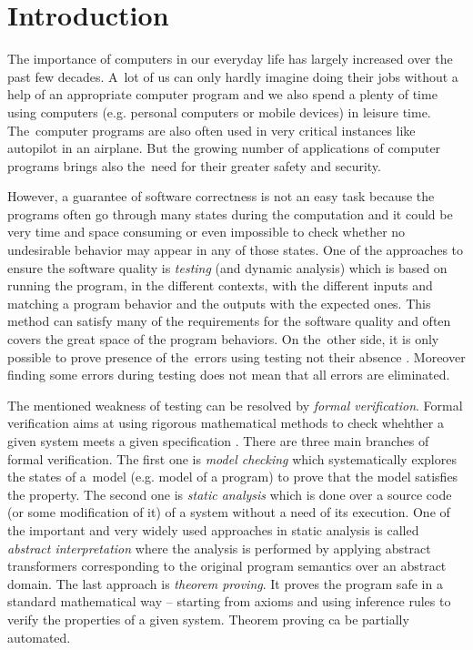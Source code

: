 \documentclass[fleqn,11pt]{ExcelAtFIT} %
\affiliation{*%
  \href{mailto:xhrusk16@stud.fit.vutbr.cz}{xhrusk16@stud.fit.vutbr.cz},
  \textit{Faculty of Information Technology, Brno University of Technology}}
\begin{document}
\startdocument



\section{Introduction}

The importance of computers in our everyday life has largely increased over the past few decades.
A~lot of us can only hardly imagine doing their jobs without a help of an appropriate computer program
and we also spend a plenty of time using computers (e.g. personal computers or mobile devices) in leisure time.
The~computer programs are also often used in very critical instances like autopilot in an airplane.
But the growing number of applications of computer programs brings also the~need for their greater safety and security.

However, a guarantee of software correctness is not an easy task
because the programs often go through many states during the computation
and it could be very time and space consuming or even impossible to check whether no undesirable behavior
may appear in any of those states.
One of the approaches to ensure the software quality is \emph{testing} (and dynamic analysis) which is based
on running the program, in the different contexts, with the different inputs
and matching a program behavior and the outputs with the expected ones.
This method can satisfy many of the requirements for the software quality and often covers the great space of the program behaviors.
On the~other side, it is only possible to prove presence of the~errors using testing not their absence \cite{dijkstra}.
Moreover finding some errors during testing does not mean that all errors are eliminated.

The mentioned weakness of testing can be resolved by \emph{formal verification}.
Formal verification aims at using rigorous mathematical methods to check whehther a given system meets a given specification \cite{fav:lecture}.
There are three main branches of formal verification.
The first one is \emph{model checking} which systematically explores the states of a~model (e.g. model of a program) to
prove that the model satisfies the property.
The second one is \emph{static analysis} which is done over a source code (or some modification of it) of a system
without a need of its execution.
One of the important and very widely used approaches in static analysis is called \emph{abstract interpretation} where the analysis is performed by
applying abstract transformers corresponding to the original program semantics over an abstract domain.
The last approach is \emph{theorem proving}.
It proves the program safe in a standard mathematical way -- starting from axioms and using inference rules to
verify the properties of a given system.
Theorem proving ca be partially automated.
\end{document}

